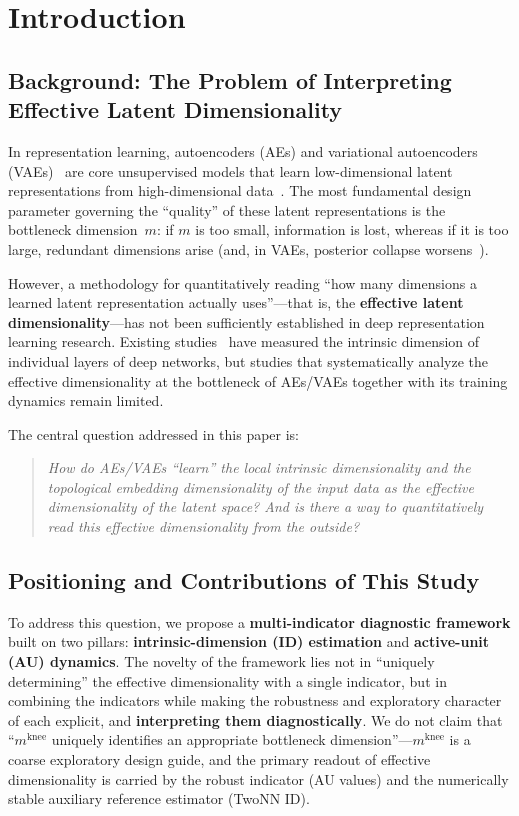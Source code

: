 \documentclass[make,article,submit,pdftex,moreauthors]{Definitions/mdpi}
\newcommand{\mknee}{m^{\mathrm{knee}}}
\begin{document}
\section{Introduction}\label{sec:intro}

\subsection{Background: The Problem of Interpreting Effective Latent Dimensionality}\label{sec:intro_bg}

In representation learning, autoencoders (AEs) and
variational autoencoders (VAEs)~\cite{kingma2014vae} are
core unsupervised models that learn low-dimensional latent representations
from high-dimensional data~\cite{bengio2013representation}.
The most fundamental design parameter governing the ``quality'' of these
latent representations is the bottleneck dimension~$m$:
if $m$ is too small, information is lost, whereas if it is too large,
redundant dimensions arise (and, in VAEs, posterior collapse
worsens~\cite{lucas2019elbo}).

However, a methodology for quantitatively reading ``how many dimensions a
learned latent representation actually uses''---that is, the
\textbf{effective latent dimensionality}---has not been sufficiently
established in deep representation learning research.
Existing studies~\cite{ansuini2019intrinsic,valeriani2023geometry} have
measured the intrinsic dimension of individual layers of deep networks,
but studies that systematically analyze the effective dimensionality at the
bottleneck of AEs/VAEs together with its training dynamics remain limited.

The central question addressed in this paper is:
\begin{quote}
\textit{How do AEs/VAEs ``learn'' the local intrinsic dimensionality and the
topological embedding dimensionality of the input data as the effective
dimensionality of the latent space?
And is there a way to quantitatively read this effective dimensionality
from the outside?}
\end{quote}

\subsection{Positioning and Contributions of This Study}\label{sec:intro_aim}

To address this question, we propose a
\textbf{multi-indicator diagnostic framework} built on two pillars:
\textbf{intrinsic-dimension (ID) estimation} and \textbf{active-unit (AU) dynamics}.
The novelty of the framework lies not in ``uniquely determining'' the
effective dimensionality with a single indicator, but in combining the
indicators while making the robustness and exploratory character of each
explicit, and \textbf{interpreting them diagnostically}.
We do not claim that ``$\mknee$ uniquely identifies an appropriate
bottleneck dimension''---$\mknee$ is a coarse exploratory design guide,
and the primary readout of effective dimensionality is carried by the
robust indicator (AU values) and the numerically stable auxiliary
reference estimator (TwoNN ID).
\end{document}

